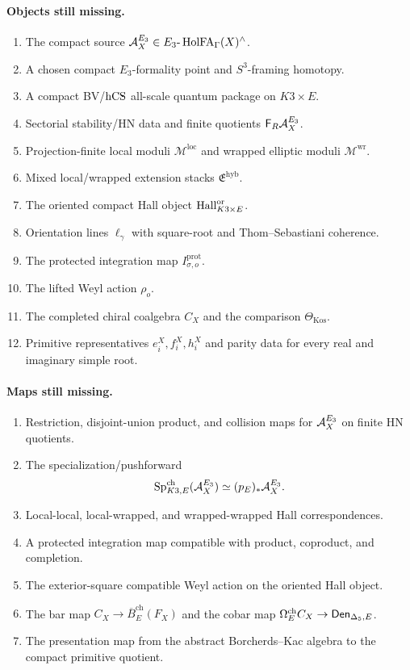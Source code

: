 \paragraph{Objects still missing.}
\begin{enumerate}
\item The compact source \(\mathcal A^{E_3}_X\in E_3\text{-}\operatorname{HolFA}_\Gamma(X)^\wedge\).
\item A chosen compact \(E_3\)-formality point and \(S^3\)-framing homotopy.
\item A compact BV/\(\operatorname{hCS}\) all-scale quantum package on \(K3\times E\).
\item Sectorial stability/HN data and finite quotients \(\mathsf F_R\mathcal A^{E_3}_X\).
\item Projection-finite local moduli \(\mathcal M^{\operatorname{loc}}\) and
wrapped elliptic moduli \(\mathcal M^{\operatorname{wr}}\).
\item Mixed local/wrapped extension stacks \(\mathfrak E^{\operatorname{hyb}}\).
\item The oriented compact Hall object \(\operatorname{Hall}^{\operatorname{or}}_{K3\times E}\).
\item Orientation lines \(\ell_\gamma\) with square-root and
Thom--Sebastiani coherence.
\item The protected integration map \(I^{\operatorname{prot}}_{\sigma,o}\).
\item The lifted Weyl action \(\rho_o\).
\item The completed chiral coalgebra \(C_X\) and the comparison
\(\Theta_{\operatorname{Kos}}\).
\item Primitive representatives \(e_i^X,f_i^X,h_i^X\) and parity data for
every real and imaginary simple root.
\end{enumerate}

\paragraph{Maps still missing.}
\begin{enumerate}
\item Restriction, disjoint-union product, and collision maps for \(\mathcal A^{E_3}_X\)
on finite HN quotients.
\item The specialization/pushforward
\[
        \operatorname{Sp}^{\operatorname{ch}}_{K3,E}(\mathcal A^{E_3}_X)\simeq (p_E)_*\mathcal A^{E_3}_X.
\]
\item Local-local, local-wrapped, and wrapped-wrapped Hall correspondences.
\item A protected integration map compatible with product, coproduct, and
completion.
\item The exterior-square compatible Weyl action on the oriented Hall object.
\item The bar map \(C_X\to\overline B_E^{\operatorname{ch}}(F_X)\) and
the cobar map \(\Omega_E^{\operatorname{ch}}C_X\to\mathsf{Den}_{\Delta_5,E}\).
\item The presentation map from the abstract Borcherds--Kac algebra to the
compact primitive quotient.
\end{enumerate}

